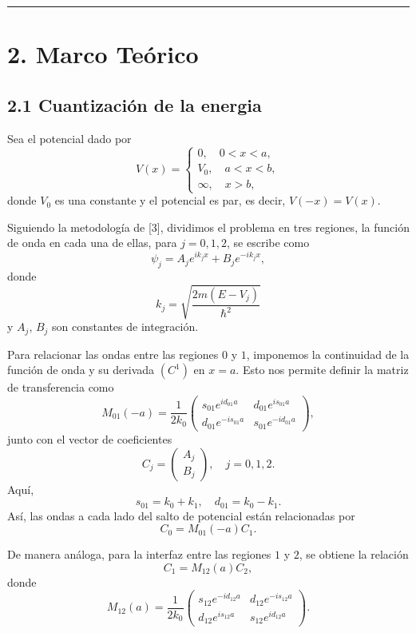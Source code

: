 \documentclass[11pt]{article}
\begin{document}
\noindent\rule{\textwidth}{0.5pt}
\section{\textbf{2. Marco Teórico}}
\label{sec:orgd7fc039}
\subsection{\textbf{2.1 Cuantización de la energia}}
\label{sec:orgda3cdd4}
Sea el potencial dado por
$$
 V(x) = \begin{cases} 0, \quad 0 < x < a,\\
                      V_0, \quad a < x < b,\\
                      \infty, \quad x > b,
 \end{cases}
 $$
donde \(V_0\) es una constante y el potencial es par, es decir, \(V(-x)
= V(x)\).

Siguiendo la metodología de [3], dividimos el problema en tres regiones, la
función de onda en cada una de ellas, para \(j = 0,1,2\), se escribe como
$$ \psi_j = A_j e^{ik_j x} + B_j e^{-ik_j x},
$$
donde
$$ k_j = \sqrt{\frac{2m(E - V_j)}{\hbar^2}} $$
y \(A_j\), \(B_j\) son constantes de integración.

Para relacionar las ondas entre las regiones \(0\) y \(1\), imponemos la
continuidad de la función de onda y su derivada \((C^1)\) en \(x=a\).
Esto nos permite definir la matriz de transferencia como
$$
 M_{01}(-a) = \frac{1}{2k_0} \begin{pmatrix} s_{01} e^{id_{01}a} & d_{01} e^{is_{01}a} \\
                                             d_{01} e^{-is_{01}a} & s_{01}e^{-id_{01}a}
                             \end{pmatrix},
$$
junto con el vector de coeficientes
$$
C_j = \begin{pmatrix} A_j \\ B_j \end{pmatrix}, \quad j = 0,1,2.
 $$
Aquí,
$$ s_{01} = k_0 + k_1, \quad d_{01} = k_0 - k_1.
$$
Así, las ondas a cada lado del salto de potencial están relacionadas por
$$ C_0 = M_{01}(-a)C_1. $$

De manera análoga, para la interfaz entre las regiones \(1\) y \(2\), se
obtiene la relación
$$ C_1 = M_{12}(a)C_2, $$
donde
$$
 M_{12}(a) = \frac{1}{2k_0} \begin{pmatrix} s_{12} e^{-id_{12}a} & d_{12} e^{-is_{12}a} \\
                                            d_{12} e^{is_{12}a} & s_{12}e^{id_{12}a}
                            \end{pmatrix}.
$$
\end{document}
